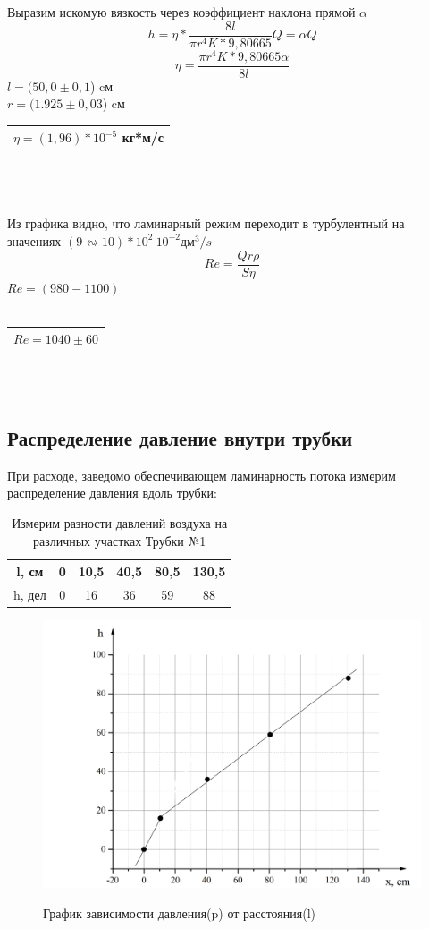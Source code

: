 \documentclass[a4paper,12pt]{article}
\theoremstyle{plain} %
\theoremstyle{definition} %
\theoremstyle{remark} %
\begin{document}
Выразим искомую вязкость через коэффициент наклона прямой $\alpha$
$$h=\eta*\frac{8l}{\pi r^4K*9,80665}Q=\alpha Q$$
$$\eta = \frac{\pi r^4 K*9,80665 \alpha}{8l}$$
$l=(50,0\pm0,1$) cм \\
$r=(1.925\pm0,03$) cм \\

\begin{tabular}{|c|}
\hline 
$\eta =(1,96)*10^{-5}$ кг*м/с \\ 
\hline 
\end{tabular} 
\ \\
\ \\
\ \\
Из графика видно, что ламинарный режим переходит в турбулентный на значениях $(9 \leftrightsquigarrow 10)*10^2 \ 10^{-2} \text{дм}^3/s$
$$Re=\frac{Qr\rho}{S\eta}$$
$Re=(980-1100)$
\ \\
\ \\
\begin{tabular}{|c|}
\hline 
\large{$Re=1040\pm60$}\\ 
\hline 
\end{tabular}
\ \\
\ \\
\subsection{Распределение давление внутри трубки}
При расходе, заведомо обеспечивающем ламинарность потока измерим распределение давления вдоль трубки:

\begin{table}[H]
\caption{Измерим разности давлений воздуха на различных участках Трубки №1}
\label{tab:tab2}

\begin{tabular}{|c|c|c|c|c|c|}
\hline 
l, см & 0 & 10,5 & 40,5 & 80,5 & 130,5 \\ 
\hline 
h, дел & 0 & 16 & 36 & 59 & 88 \\ 
\hline 
\end{tabular}
\end{table}

\begin{figure}[!h]
{\includegraphics[width=1\linewidth]{Graph4.jpg}}
\caption{График зависимости давления(p) от расстояния(l)}
\end{figure}
\end{document}
